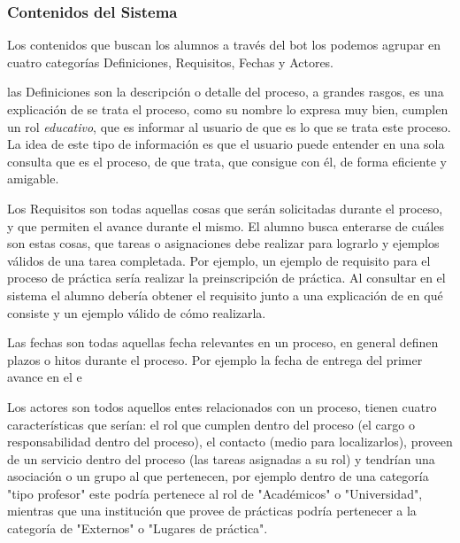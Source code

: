         \subsubsection{Contenidos del Sistema}
        \label{sssec:contenidos}
            \par Los contenidos que buscan los alumnos a través del bot los podemos agrupar en cuatro categorías Definiciones, Requisitos, Fechas y Actores.
            \par las Definiciones son la descripción o detalle del proceso, a grandes rasgos, es una explicación de se trata el proceso, como su nombre lo expresa muy bien, cumplen un rol \textit{educativo}, que es informar al usuario de que es lo que se trata este proceso. La idea de este tipo de información es que el usuario puede entender en una sola consulta que es el proceso, de que trata, que consigue con él, de forma eficiente y amigable.
            \par Los Requisitos son todas aquellas cosas que serán solicitadas durante el proceso, y que permiten el avance durante el mismo. El alumno busca enterarse de cuáles son estas cosas, que tareas o asignaciones debe realizar para lograrlo y ejemplos válidos de una tarea completada. Por ejemplo, un ejemplo de requisito para el proceso de práctica sería realizar la preinscripción de práctica. Al consultar en el sistema el alumno debería obtener el requisito junto a una explicación de en qué consiste y un ejemplo válido de cómo realizarla.
            \par Las fechas son todas aquellas fecha relevantes en un proceso, en general definen plazos o hitos durante el proceso. Por ejemplo la fecha de entrega del primer avance en el \acrshort{e}
            \par Los actores son todos aquellos entes relacionados con un proceso, tienen cuatro características que serían: el rol que cumplen dentro del proceso (el cargo o responsabilidad dentro del proceso), el contacto (medio para localizarlos), proveen de un servicio dentro del proceso (las tareas asignadas a su rol) y tendrían una asociación o un grupo al que pertenecen, por ejemplo dentro de una categoría "tipo profesor" este podría pertenece al rol de "Académicos" o "Universidad", mientras que una institución que provee de prácticas podría pertenecer a la categoría de "Externos" o "Lugares de práctica".
            
